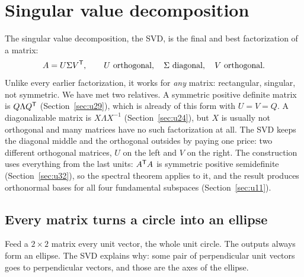 \section{Singular value decomposition}\label{sec:u33}

The singular value decomposition, the SVD, is the final and best factorization of a matrix:
\[
  A=U\Sigma V^{\mathsf{T}} ,\qquad U \text{ orthogonal},\quad \Sigma \text{ diagonal},\quad V \text{ orthogonal}.
\]
Unlike every earlier factorization, it works for \emph{any} matrix: rectangular, singular, not
symmetric. We have met two relatives. A symmetric positive definite matrix is $Q\Lambda Q^{\mathsf{T}}$
(Section~\ref{sec:u29}), which is already of this form with $U=V=Q$. A diagonalizable matrix is
$X\Lambda X^{-1}$ (Section~\ref{sec:u24}), but $X$ is usually not orthogonal and many matrices have
no such factorization at all. The SVD keeps the diagonal middle and the orthogonal outsides by
paying one price: two different orthogonal matrices, $U$ on the left and $V$ on the right. The
construction uses everything from the last units: $A^{\mathsf{T}} A$ is symmetric positive semidefinite
(Section~\ref{sec:u32}), so the spectral theorem applies to it, and the result produces
orthonormal bases for all four fundamental subspaces (Section~\ref{sec:u11}).

\subsection{Every matrix turns a circle into an ellipse}

Feed a $2\times2$ matrix every unit vector, the whole unit circle. The outputs always form an
ellipse. The SVD explains why: some pair of perpendicular unit vectors goes to perpendicular
vectors, and those are the axes of the ellipse.

